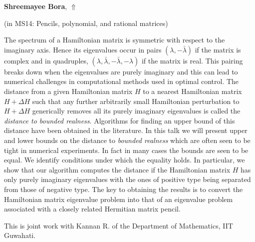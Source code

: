 \documentclass[ILAS2025-program.tex]{subfiles}
\begin{document}
\hypertarget{down0372}{}\begin{ilasabstract}
    
\textbf{Shreemayee Bora},  \hfill \hyperlink{up0372}{$\Uparrow$}
    
    
(in {\color{mstitle}MS14: Pencils, polynomial, and rational matrices})
        
\mtskip
    The spectrum of a Hamiltonian matrix is symmetric with respect to the imaginary axis. Hence its eigenvalues occur in pairs $(\lambda, -\bar{\lambda})$ if the matrix is complex and in quadruples, $(\lambda, \bar{\lambda}, -\bar{\lambda},-\lambda)$ if the matrix is real. This pairing breaks down when the eigenvalues are purely imaginary and this can lead to numerical challenges in computational methods used in optimal control.  The distance from a given Hamiltonian matrix $H$ to a nearest Hamiltonian matrix $H + \Delta H$ such that any further arbitrarily small Hamiltonian perturbation to $H + \Delta H$ generically removes all its purely imaginary eigenvalues is called the \emph{distance to bounded realness}. Algorithms for finding an upper bound of this distance have been obtained in the literature. In this talk we will present upper and lower bounds on the distance to \emph{bounded realness} which are often seen to be tight in numerical experiments. In fact in many cases the bounds are seen to be equal. We identify conditions under which the equality holds. In particular, we show that our algorithm computes the distance if the Hamiltonian matrix $H$ has only purely imaginary eigenvalues with the ones of positive type being separated from those of negative type. The key to obtaining the results is to convert the Hamiltonian matrix eigenvalue problem into that of an eigenvalue problem associated with a closely related Hermitian matrix pencil.

This is joint work with Kannan R. of the Department of Mathematics, IIT Guwahati. 

\end{ilasabstract}
    
\end{document}
